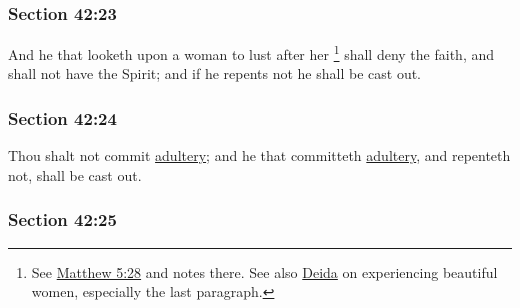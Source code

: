 
	\subsubsection{Section 42:23} %
		\label{DC42-23}

		And he that looketh upon a woman to lust after her%
			\footnote{%
				See \hyperref[MATTHEW-5-28]{Matthew 5:28} and notes there. See also \hyperref[TTW-WOMEN-OTHERS-0001]{Deida} on experiencing beautiful women, especially the last paragraph.
				}
		shall deny the faith, and shall not have the Spirit; and if he repents not he shall be cast out.


	\subsubsection{Section 42:24} %
		\label{DC42-24}

		Thou shalt not commit \hyperref[ADULTERY]{adultery}; and he that committeth \hyperref[ADULTERY]{adultery}, and repenteth not, shall be cast out.


	\subsubsection{Section 42:25} %
		\label{DC42-25}

